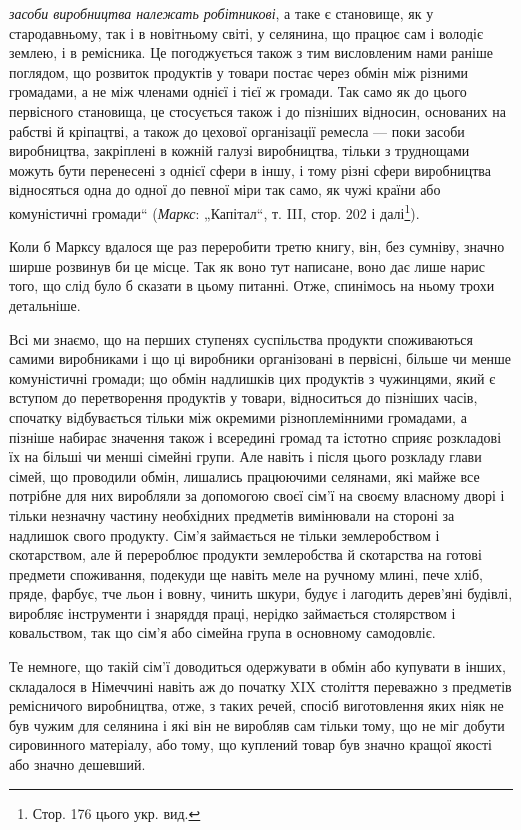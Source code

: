 \parcont{}  %
\emph{засоби виробництва належать робітникові}, а таке є становище, як у стародавньому, так і в новітньому світі, у селянина, що працює
сам і володіє землею, і в ремісника. Це погоджується також з тим висловленим нами раніше поглядом, що розвиток
продуктів у товари постає через обмін між різними громадами, а не між членами однієї і тієї ж громади. Так само як до цього
первісного становища, це стосується також і до пізніших відносин, основаних на рабстві й кріпацтві, а також до цехової
організації ремесла — поки засоби виробництва, закріплені в кожній галузі виробництва, тільки з труднощами можуть бути
перенесені з однієї сфери в іншу, і тому різні сфери виробництва відносяться одна до одної до певної міри так само, як чужі
країни або комуністичні громади“ (\emph{Маркс}: „Капітал“,  т. III, стор. 202 і далі\footnote*{Стор. 176 цього укр. вид. }).

Коли б Марксу вдалося ще раз переробити третю книгу, він, без сумніву, значно ширше розвинув би це місце. Так як воно тут
написане, воно дає лише нарис того, що слід було б сказати в цьому питанні. Отже, спинімось на ньому трохи детальніше.

Всі ми знаємо, що на перших ступенях суспільства продукти споживаються самими виробниками і що ці виробники організовані в
первісні, більше чи менше комуністичні громади; що обмін надлишків цих продуктів з чужинцями, який є вступом до перетворення
продуктів у товари, відноситься до пізніших часів, спочатку відбувається тільки між окремими різноплемінними громадами, а
пізніше набирає значення також і всередині громад та істотно сприяє розкладові їх на більші чи менші сімейні групи. Але
навіть і після цього розкладу глави сімей, що проводили обмін, лишались працюючими селянами, які майже все потрібне для
них виробляли за допомогою своєї сім’ї на своєму власному дворі і тільки незначну частину необхідних предметів вимінювали на
стороні за надлишок свого продукту. Сім’я займається не тільки землеробством і скотарством, але й перероблює продукти
землеробства й скотарства на готові предмети споживання, подекуди ще навіть меле на ручному млині, пече хліб, пряде, фарбує,
тче льон і вовну, чинить шкури, будує і лагодить дерев’яні будівлі, виробляє інструменти і знаряддя праці, нерідко
займається столярством і ковальством, так що сім’я або сімейна група в основному самодовліє.

Те немноге, що такій сім’ї
доводиться одержувати в обмін або купувати в інших, складалося в Німеччині навіть аж до початку XIX століття переважно з
предметів ремісничого виробництва, отже, з таких речей, спосіб виготовлення яких ніяк не був чужим для селянина і які він не
виробляв сам тільки тому, що не міг добути сировинного матеріалу, або тому, що куплений товар був значно кращої якості або
значно дешевший.
